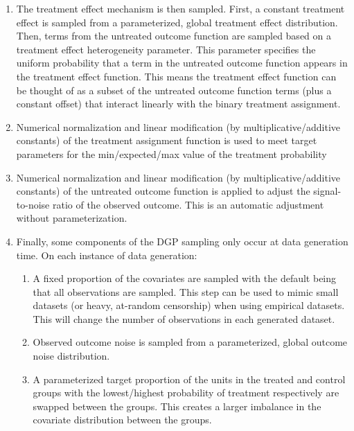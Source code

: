 \documentclass[../main.tex]{subfiles}
\begin{document}
\begin{enumerate}
    \item The treatment effect mechanism is then sampled. First, a constant treatment effect is sampled from a parameterized, global treatment effect distribution. Then, terms from the untreated outcome function are sampled based on a treatment effect heterogeneity parameter. This parameter specifies the uniform probability that a term in the untreated outcome function appears in the treatment effect function. This means the treatment effect function can be thought of as a subset of the untreated outcome function terms (plus a constant offset) that interact linearly with the binary treatment assignment.

    \item Numerical normalization and linear modification (by multiplicative/additive constants) of the treatment assignment function is used to meet target parameters for the min/expected/max value of the treatment probability

    \item Numerical normalization and linear modification (by multiplicative/additive constants) of the untreated outcome function is applied to adjust the signal-to-noise ratio of the observed outcome. This is an automatic adjustment without parameterization.

    \item Finally, some components of the DGP sampling only occur at data generation time. On each instance of data generation:

    \begin{enumerate}
        \item A fixed proportion of the covariates are sampled with the default being that all observations are sampled. This step can be used to mimic small datasets (or heavy, at-random censorship) when using empirical datasets. This will change the number of observations in each generated dataset.
        \item Observed outcome noise is sampled from a parameterized, global outcome noise distribution.
        \item A parameterized target proportion of the units in the treated and control groups with the lowest/highest probability of treatment respectively are swapped between the groups. This creates a larger imbalance in the covariate distribution between the groups.
    \end{enumerate}

\end{enumerate}
\end{document}
